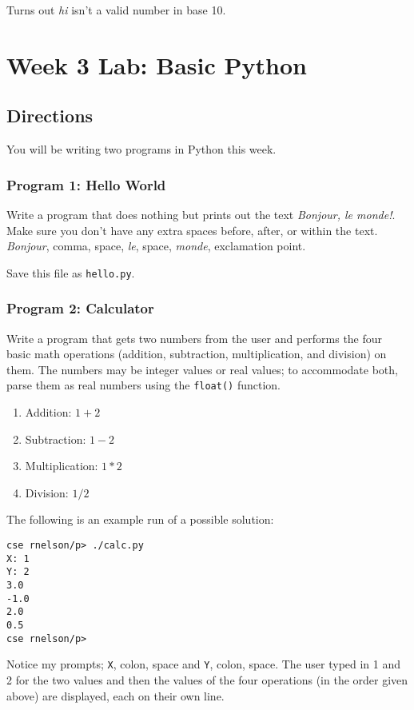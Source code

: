\documentclass[11pt, letterpaper]{article}
\begin{document}
Turns out {\em hi} isn't a valid number in base 10.


\section*{Week 3 Lab: Basic Python}

\subsection*{Directions}

You will be writing two programs in Python this week.

\subsubsection*{Program 1: Hello World}

Write a program that does nothing but prints out the text {\em Bonjour, le monde!}. Make sure you don't have any extra spaces before, after, or within the text. {\em Bonjour}, comma, space, {\em le}, space, {\em monde}, exclamation point.

Save this file as {\tt hello.py}.

\subsubsection*{Program 2: Calculator}

Write a program that gets two numbers from the user and performs the four basic math operations (addition, subtraction, multiplication, and division) on them. The numbers may be integer values or real values; to accommodate both, parse them as real numbers using the {\tt float()} function.

\begin{enumerate}
	\item Addition: $1 + 2$
	\item Subtraction: $1 - 2$
	\item Multiplication: $1 * 2$
	\item Division: $1 / 2$
\end{enumerate}

The following is an example run of a possible solution:

\begin{lstlisting}
cse rnelson/p> ./calc.py 
X: 1
Y: 2
3.0
-1.0
2.0
0.5
cse rnelson/p>
\end{lstlisting}

Notice my prompts; {\tt X}, colon, space and {\tt Y}, colon, space. The user typed in 1 and 2 for the two values and then the values of the four operations (in the order given above) are displayed, each on their own line.
\end{document}

